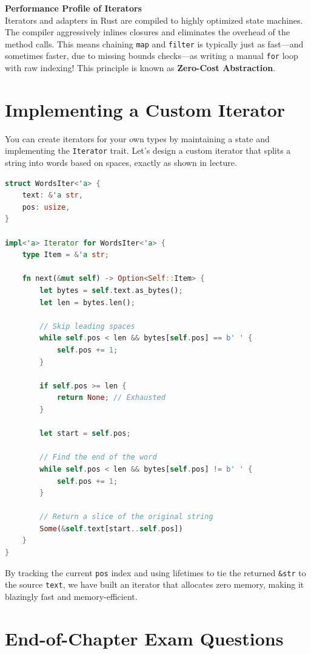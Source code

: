 \begin{exambox}
\textbf{Performance Profile of Iterators} \\
Iterators and adapters in Rust are compiled to highly optimized state machines. The compiler aggressively inlines closures and eliminates the overhead of the method calls. This means chaining \texttt{map} and \texttt{filter} is typically just as fast—and sometimes faster, due to missing bounds checks—as writing a manual \texttt{for} loop with raw indexing! This principle is known as \textbf{Zero-Cost Abstraction}.
\end{exambox}

\section{Implementing a Custom Iterator}
You can create iterators for your own types by maintaining a state and implementing the \texttt{Iterator} trait. Let's design a custom iterator that splits a string into words based on spaces, exactly as shown in lecture.

\begin{lstlisting}[language=Rust]
struct WordsIter<'a> {
    text: &'a str,
    pos: usize,
}

impl<'a> Iterator for WordsIter<'a> {
    type Item = &'a str;

    fn next(&mut self) -> Option<Self::Item> {
        let bytes = self.text.as_bytes();
        let len = bytes.len();
        
        // Skip leading spaces
        while self.pos < len && bytes[self.pos] == b' ' {
            self.pos += 1;
        }
        
        if self.pos >= len {
            return None; // Exhausted
        }
        
        let start = self.pos;
        
        // Find the end of the word
        while self.pos < len && bytes[self.pos] != b' ' {
            self.pos += 1;
        }
        
        // Return a slice of the original string
        Some(&self.text[start..self.pos])
    }
}
\end{lstlisting}

By tracking the current \texttt{pos} index and using lifetimes to tie the returned \texttt{\&str} to the source \texttt{text}, we have built an iterator that allocates zero memory, making it blazingly fast and memory-efficient.

\section*{End-of-Chapter Exam Questions}

